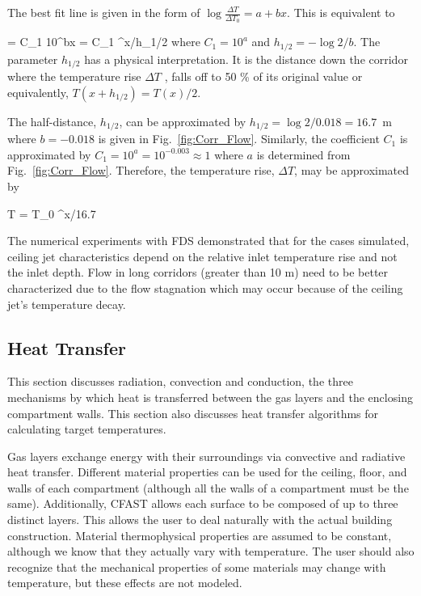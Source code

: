 The best fit line is given in the form of $\log{\frac{\Delta T}{\Delta T_0}} = a + bx$. This is equivalent to

\be {} = C_1 10^{bx}  = C_1 ^{x/h_{1/2}} \ee
where $C_1 = 10^a$ and $h_{1/2} = - \log{2}/b$. The parameter $h_{1/2}$ has a physical interpretation.  It is the distance down the corridor where the temperature rise $\Delta T$ , falls off to 50 \% of its original value or equivalently, $T(x + h_{1/2}) = T (x)/2$.

The half-distance, $h_{1/2}$, can be approximated by $h_{1/2} = \log{2}/0.018 = 16.7$~m where $b = -0.018$ is given in Fig.~\ref{fig:Corr_Flow}. Similarly, the coefficient $C_1$ is approximated by $C_1 = 10^a = 10^{-0.003} \approx 1$ where $a$ is determined from Fig.~\ref{fig:Corr_Flow}. Therefore, the temperature rise, $\Delta T$, may be approximated by

\be \Delta T = \Delta T_0 ^{x/16.7} \ee

The numerical experiments with FDS  demonstrated that for the cases simulated, ceiling jet characteristics depend on the relative inlet temperature rise and not the inlet depth.  Flow in long corridors (greater than 10 m) need to be better characterized due to the flow stagnation which may occur because of the ceiling jet's temperature decay.

\subsection{Heat Transfer}

This section discusses radiation, convection and conduction, the three mechanisms by which heat is transferred between the gas layers and the enclosing compartment walls.  This section also discusses heat transfer algorithms for calculating target temperatures.

Gas layers exchange energy with their surroundings via convective and radiative heat transfer.  Different material properties can be used for the ceiling, floor, and walls of each compartment (although all the walls of a compartment must be the same).  Additionally, CFAST allows each surface to be composed of up to three distinct layers.  This allows the user to deal naturally with the actual building construction.  Material thermophysical properties are assumed to be constant, although we know that they actually vary with temperature. The user should also recognize that the mechanical properties of some materials may change with temperature, but these effects are not modeled.						

